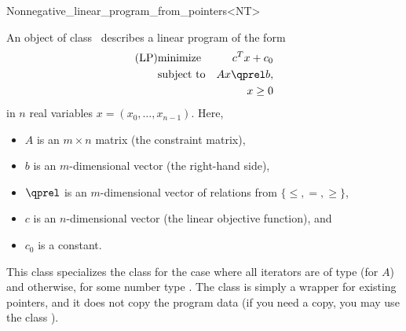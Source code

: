 \begin{ccRefClass}{Nonnegative_linear_program_from_pointers<NT>}


\ccDefinition
An object of class \ccRefName\ describes a linear program of the form
\begin{eqnarray*}
\mbox{(LP)}& \mbox{minimize} & c^{T}x+c_0 \\
&\mbox{subject to}   & Ax\qprel b, \\
&                    & x \geq 0
\end{eqnarray*}
in $n$ real variables $x=(x_0,\ldots,x_{n-1})$.
Here, 
\begin{itemize}
\item $A$ is an $m\times n$ matrix (the constraint matrix), 
\item $b$ is an $m$-dimensional vector (the right-hand side),
\item $\qprel$ is an $m$-dimensional vector of relations 
from $\{\leq, =, \geq\}$, 
\item $c$ is an $n$-dimensional vector (the linear objective
  function), and 
\item $c_0$ is a constant.
\end{itemize}

This class specializes the class
for the case where all iterators are of type  (for
$A$) and  otherwise, for some number type .
The class is simply a wrapper for 
existing pointers, and it does not copy the program data (if you need
a copy, you may use the class ).

\ccIsModel
{}

\ccTypes
{}

\ccSeeAlso
{}\\
\\

\end{ccRefClass}
